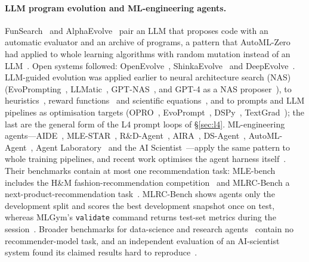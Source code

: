 \documentclass[sigconf,nonacm]{acmart}
\begin{document}
\paragraph{LLM program evolution and ML-engineering agents.} FunSearch~\cite{romeraparedes2023funsearch} and
AlphaEvolve~\cite{novikov2025alphaevolve} pair an LLM that proposes code with an automatic evaluator and an archive of
programs, a pattern that AutoML-Zero had applied to whole learning algorithms with random mutation instead of an
LLM~\cite{real2020automlzero}. Open systems followed: OpenEvolve~\cite{openevolve}, ShinkaEvolve~\cite{lange2025shinka} and
DeepEvolve~\cite{liu2025deepevolve}. LLM-guided evolution was applied earlier to neural architecture search (NAS)
(EvoPrompting~\cite{chen2023evoprompting}, LLMatic~\cite{nasir2023llmatic}, GPT-NAS~\cite{yu2023gptnas}, and GPT-4 as a
NAS proposer~\cite{zheng2023gpt4nas}), to heuristics~\cite{ye2024reevo}, reward functions~\cite{ma2023eureka} and
scientific equations~\cite{shojaee2024llmsr}, and to prompts and LLM pipelines as optimisation targets
(OPRO~\cite{yang2023opro}, EvoPrompt~\cite{guo2023evoprompt}, DSPy~\cite{khattab2023dspy},
TextGrad~\cite{yuksekgonul2024textgrad}); the last are the general form of the L4 prompt loops of
\S\ref{sec:l4}. ML-engineering agents---AIDE~\cite{jiang2025aide},
MLE-STAR~\cite{nam2025mlestar}, R\&D-Agent~\cite{yang2025rdagent}, AIRA~\cite{toledo2025aira}, DS-Agent~\cite{guo2024dsagent},
AutoML-Agent~\cite{trirat2024automlagent}, Agent Laboratory~\cite{schmidgall2025agentlab} and the AI
Scientist~\cite{lu2024aiscientist,yamada2025aiscientistv2}---apply the same pattern to whole training pipelines, and
recent work optimises the agent harness itself~\cite{lou2026autoharness,lee2026metaharness,xu2026harness2,wong2025confucius}. Their
benchmarks contain at most one recommendation task: MLE-bench includes the H\&M fashion-recommendation
competition~\cite{chan2024mlebench} and MLRC-Bench a next-product-recommendation task~\cite{zhang2025mlrcbench}.
MLRC-Bench shows agents only the development split and scores the best development snapshot once on test, whereas
MLGym's \texttt{validate} command returns test-set metrics during the session~\cite{nathani2025mlgym}. Broader
benchmarks for data-science and research agents~\cite{chen2024scienceagentbench,jing2024dsbench,qiang2025mledojo,
starace2025paperbench,chen2025mlrbench,kon2025expbench} contain no recommender-model task, and an independent evaluation
of an AI-scientist system found its claimed results hard to reproduce~\cite{beel2025aiscientist}.
\end{document}
